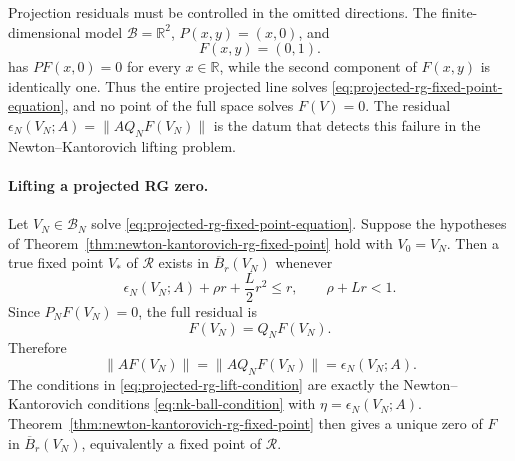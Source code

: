 \begin{example}
Projection residuals must be controlled in the omitted directions.  The
finite-dimensional model
\(\mathcal B=\mathbb R^2\), \(P(x,y)=(x,0)\), and
\[
  F(x,y)=(0,1).
\]
has \(P F(x,0)=0\) for every \(x\in\mathbb R\), while the second component of
\(F(x,y)\) is identically one.  Thus the entire projected line solves
\eqref{eq:projected-rg-fixed-point-equation}, and no point of the full space
solves \(F(V)=0\).  The residual
\(\epsilon_N(V_N;A)=\|AQ_NF(V_N)\|\) is the datum that detects this failure in
the Newton--Kantorovich lifting problem.
\end{example}

\paragraph{Lifting a projected RG zero.}
Let \(V_N\in\mathcal B_N\) solve
\eqref{eq:projected-rg-fixed-point-equation}.  Suppose the hypotheses of
Theorem~\ref{thm:newton-kantorovich-rg-fixed-point} hold with \(V_0=V_N\).
Then a true fixed point \(V_\ast\) of \(\mathcal R\) exists in
\(\overline B_r(V_N)\) whenever
\begin{equation}
  \epsilon_N(V_N;A)+\rho r+\frac{L}{2}r^2\le r,
  \qquad
  \rho+Lr<1 .
  \label{eq:projected-rg-lift-condition}
\end{equation}
Since \(P_NF(V_N)=0\), the full residual is
\[
  F(V_N)=Q_NF(V_N).
\]
Therefore
\[
  \|AF(V_N)\|=\|AQ_NF(V_N)\|=\epsilon_N(V_N;A).
\]
The conditions in
\eqref{eq:projected-rg-lift-condition} are exactly the
Newton--Kantorovich conditions \eqref{eq:nk-ball-condition} with
\(\eta=\epsilon_N(V_N;A)\).  Theorem~\ref{thm:newton-kantorovich-rg-fixed-point}
then gives a unique zero of \(F\) in \(\overline B_r(V_N)\), equivalently a
fixed point of \(\mathcal R\).

